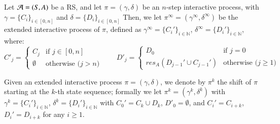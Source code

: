 \begin{definition}
Let ${\cal A}=(S,A)$ be a RS, and let $\pi =(\gamma,\delta)$  be an  $n$-step interactive process,
with $ \gamma=\{C_i\}_{i\in[0,n]}$ and  $\delta=\{D_i\}_{i\in[0,n]}$
Then, we let $\pi^\infty= (\gamma^\infty,\delta^\infty)$ be the extended interactive process of  $\pi$,
defined as $  \gamma^\infty=\{C_i'\}_{i\in\mathbb{N}}$, $\delta^\infty=\{D_i'\}_{i\in\mathbb{N}}$, where:
$$
C'_j = \left\{
\begin{array}{ll}
C_j & \mbox{if $j\in[0,n]$}\\
\emptyset & \mbox{otherwise ($j>n$)}
\end{array}
\right.
\qquad
D'_j = \left\{
\begin{array}{ll}
D_0 & \mbox{if $j=0$}\\
\mathit{res}_A(D_{j-1}' \cup C_{j-1}') & \mbox{otherwise ($j\geq 1$)}
\end{array}
\right.
$$
\end{definition}

Given an extended interactive process $\pi =(\gamma,\delta)$, we denote by $\pi^k$ the shift of $\pi$ starting at the $k$-th state sequence; formally we let $\pi^k=(\gamma^k,\delta^k)$ with
$\gamma^k=\{C_i'\}_{i\in\mathbb{N}}$, $\delta^k=\{D_i'\}_{i\in\mathbb{N}}$ with 
  $C_0'=C_k \cup D_k$, $D'_0 = \emptyset$, and   $C_i'=C_{i+k}$, $D_i'= D_{i+k}$ for any $i\geq 1$.





